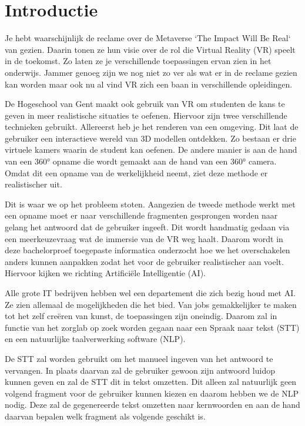 
\section{Introductie}%
\label{sec:introductie}

Je hebt waarschijnlijk de reclame over de Metaverse `The Impact Will Be Real` van \textcite{Meta2022} gezien. Daarin tonen ze hun visie over de rol die Virtual Reality (VR) speelt in de toekomst. Zo laten ze je verschillende toepassingen ervan zien in het onderwijs. Jammer genoeg zijn we nog niet zo ver als wat er in de reclame gezien kan worden maar ook nu al vind VR zich een baan in verschillende opleidingen.

De Hogeschool van Gent maakt ook gebruik van VR om studenten de kans te geven in meer realistische situaties te oefenen. Hiervoor zijn twee verschillende technieken gebruikt. Allereerst heb je het renderen van een omgeving. Dit laat de gebruiker een interactieve wereld van 3D modellen ontdekken. Zo bestaan er drie virtuele kamers waarin de student kan oefenen. De andere manier is aan de hand van een 360° opname die wordt gemaakt aan de hand van een 360° camera. Omdat dit een opname van de werkelijkheid neemt, ziet deze methode er realistischer uit.

Dit is waar we op het probleem stoten. Aangezien de tweede methode werkt met een opname moet er naar verschillende fragmenten gesprongen worden naar gelang het antwoord dat de gebruiker ingeeft. Dit wordt handmatig gedaan via een meerkeuzevraag wat de immersie van de VR weg haalt. Daarom wordt in deze bachelorproef toegepaste informatica onderzocht hoe we het overschakelen anders kunnen aanpakken zodat het voor de gebruiker realistischer aan voelt. Hiervoor kijken we richting Artificiële Intelligentie (AI).

Alle grote IT bedrijven hebben wel een departement die zich bezig houd met AI. Ze zien allemaal de mogelijkheden die het bied. Van jobs gemakkelijker te maken tot het zelf creëren van kunst, de toepassingen zijn oneindig. Daarom zal in functie van het zorglab op zoek worden gegaan naar een Spraak naar tekst (STT) en een natuurlijke taalverwerking software (NLP).

De STT zal worden gebruikt om het manueel ingeven van het antwoord te vervangen. In plaats daarvan zal de gebruiker gewoon zijn antwoord luidop kunnen geven en zal de STT dit in tekst omzetten. Dit alleen zal natuurlijk geen volgend fragment voor de gebruiker kunnen kiezen en daarom hebben we de NLP nodig. Deze zal de gegenereerde tekst omzetten naar kernwoorden en aan de hand daarvan bepalen welk fragment als volgende geschikt is.



